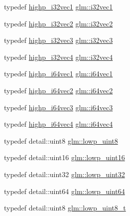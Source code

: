 \begin{DoxyCompactItemize}
\item 
typedef \hyperlink{fwd_8hpp_ad38568f19fc1dac06f1f3478689caf0e}{highp\+\_\+i32vec1} \hyperlink{group__gtc__type__precision_ga05a766bbe2ad0791ed0081baac492da7}{glm\+::i32vec1}
\item 
typedef \hyperlink{fwd_8hpp_a88f1af6328724a83287eb1fbc3471171}{highp\+\_\+i32vec2} \hyperlink{group__gtc__type__precision_ga25820e641988fe33b075d80434872d02}{glm\+::i32vec2}
\item 
typedef \hyperlink{fwd_8hpp_a83507b7234f4d89f6dbe83ec46c68c42}{highp\+\_\+i32vec3} \hyperlink{group__gtc__type__precision_gab67e08f6a4b1bce82a9a34ecb2bfba64}{glm\+::i32vec3}
\item 
typedef \hyperlink{fwd_8hpp_a09a96f2ad6c9c3ace7bfdbabed5d859f}{highp\+\_\+i32vec4} \hyperlink{group__gtc__type__precision_ga3ada3676600db65a425058c0a150d83e}{glm\+::i32vec4}
\item 
typedef \hyperlink{fwd_8hpp_a2fefd6da904e77486fc57d4596eee3f4}{highp\+\_\+i64vec1} \hyperlink{group__gtc__type__precision_ga7ee2c91a98ebd719ae26e15ad89106de}{glm\+::i64vec1}
\item 
typedef \hyperlink{fwd_8hpp_a8b9347c378dc3f977fdd0c3ea995b7ad}{highp\+\_\+i64vec2} \hyperlink{group__gtc__type__precision_ga5a03cb457be28a9a8b9e61163fe648a1}{glm\+::i64vec2}
\item 
typedef \hyperlink{fwd_8hpp_a9e2742492829f9a189289ffd79de1183}{highp\+\_\+i64vec3} \hyperlink{group__gtc__type__precision_ga189eb8d6a197bc491cabb6e1f120ecf4}{glm\+::i64vec3}
\item 
typedef \hyperlink{fwd_8hpp_af27ae242d933e3e3f0fd99a73ae09bdb}{highp\+\_\+i64vec4} \hyperlink{group__gtc__type__precision_gade5e969a6155752095d2cd603bda9408}{glm\+::i64vec4}
\item 
typedef detail\+::uint8 \hyperlink{group__gtc__type__precision_ga4d9dc08b7b248a386dfe9afd00fc6b1e}{glm\+::lowp\+\_\+uint8}
\item 
typedef detail\+::uint16 \hyperlink{group__gtc__type__precision_ga9b8409887319f62f06e664f6ca121b9d}{glm\+::lowp\+\_\+uint16}
\item 
typedef detail\+::uint32 \hyperlink{group__gtc__type__precision_gaf11e85af414720b4cd12bd57b3a81e68}{glm\+::lowp\+\_\+uint32}
\item 
typedef detail\+::uint64 \hyperlink{group__gtc__type__precision_gacf666a9d9b309c4615c7a4f2ab0be289}{glm\+::lowp\+\_\+uint64}
\item 
typedef detail\+::uint8 \hyperlink{group__gtc__type__precision_ga0910ef24195d1b8b26e34d73148c0c45}{glm\+::lowp\+\_\+uint8\+\_\+t}

\end{DoxyCompactItemize}

